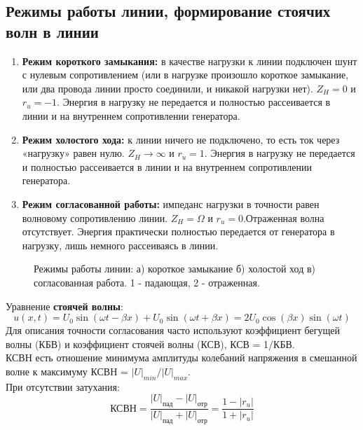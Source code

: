 \documentclass[12pt]{article}
\begin{document}
\begin{flushleft}
\subsection{Режимы работы линии, формирование стоячих волн в линии}
\begin{enumerate}
\item \textbf{Режим короткого замыкания:} в
качестве нагрузки к линии подключен шунт с нулевым сопротивлением
(или в нагрузке произошло короткое замыкание, или два провода линии
просто соединили, и никакой нагрузки нет). $Z_H=0$ и $r_u =-1$. Энергия в нагрузку не передается и полностью
рассеивается в линии и на внутреннем сопротивлении генератора.
\item \textbf{Режим холостого хода:} к линии ничего не подключено, то есть ток через
«нагрузку» равен нулю. $Z_H \rightarrow \infty$ и $r_u = 1$. Энергия в нагрузку не передается и полностью рассеивается в линии и на внутреннем сопротивлении генератора. 
\item \textbf{Режим согласованной работы:} импеданс нагрузки в точности равен волновому сопротивлению линии. $Z_H= \Omega$ и $r_u =0$.Отраженная волна отсутствует. Энергия практически
полностью передается от генератора в нагрузку, лишь немного рассеиваясь в линии. 
\end{enumerate}
\begin{figure}[!h]
\caption{Режимы работы линии: а) короткое замыкание б) холостой ход в) согласованная работа. 1 - падающая, 2 - отраженная.}
\label{ris:image}
\end{figure}
Уравнение \textbf{стоячей волны}:
\begin{equation}
u(x,t) = U_0 \sin (\omega t - \beta x) + U_0 \sin (\omega t + \beta x)=2U_0 \cos (\beta x)\sin (\omega t)
\end{equation}
Для описания точности согласования часто используют
коэффициент бегущей волны (КБВ) и коэффициент стоячей волны
(КСВ), КСВ = 1/КБВ.\\
КСВН есть отношение минимума амплитуды колебаний напряжения в смешанной волне к максимуму КСВН = $|U|_{min}/|U|_{max}$.\\
При отсутствии затухания:
\begin{equation}
\text{КСВН} = \frac{|U|_{\text{пад}}-|U|_{\text{отр}}}{|U|_{\text{пад}}+|U|_{\text{отр}}} = \frac{1-|r_u|}{1+|r_u|}
\end{equation}

\end{flushleft}
\end{document}
